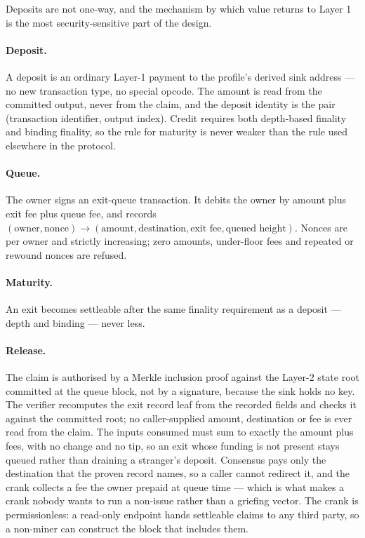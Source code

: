 \documentclass{article}
\begin{document}
Deposits are not one-way, and the mechanism by which value returns to Layer 1
is the most security-sensitive part of the design.

\paragraph{Deposit.} A deposit is an ordinary Layer-1 payment to the profile's
derived sink address --- no new transaction type, no special opcode. The
amount is read from the committed output, never from the claim, and the
deposit identity is the pair (transaction identifier, output index). Credit
requires both depth-based finality and binding finality, so the rule for
maturity is never weaker than the rule used elsewhere in the protocol.

\paragraph{Queue.} The owner signs an exit-queue transaction. It debits the
owner by amount plus exit fee plus queue fee, and records
$(\text{owner}, \text{nonce}) \rightarrow (\text{amount}, \text{destination},
\text{exit fee}, \text{queued height})$. Nonces are per owner and strictly
increasing; zero amounts, under-floor fees and repeated or rewound nonces are
refused.

\paragraph{Maturity.} An exit becomes settleable after the same finality
requirement as a deposit --- depth and binding --- never less.

\paragraph{Release.} The claim is authorised by a Merkle inclusion proof
against the Layer-2 state root committed at the queue block, not by a
signature, because the sink holds no key. The verifier recomputes the exit
record leaf from the recorded fields and checks it against the committed root;
no caller-supplied amount, destination or fee is ever read from the claim.
The inputs consumed must sum to exactly the amount plus fees, with no change
and no tip, so an exit whose funding is not present stays queued rather than
draining a stranger's deposit. Consensus pays only the destination that the
proven record names, so a caller cannot redirect it, and the crank collects a
fee the owner prepaid at queue time --- which is what makes a crank nobody
wants to run a non-issue rather than a griefing vector. The crank is
permissionless: a read-only endpoint hands settleable claims to any third
party, so a non-miner can construct the block that includes them.
\end{document}
